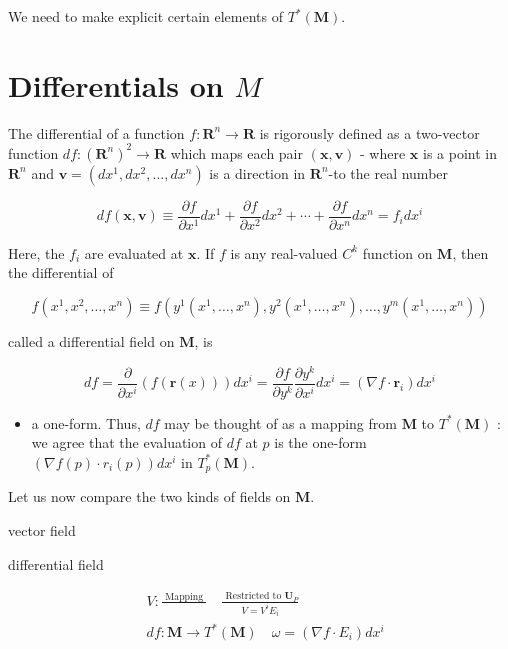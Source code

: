 \documentclass[10pt]{article}
\begin{document}
We need to make explicit certain elements of $T^{*}(\mathbf{M})$.

\section*{Differentials on $M$}
The differential of a function $f: \mathbf{R}^{n} \rightarrow \mathbf{R}$ is rigorously defined as a two-vector function $d f:\left(\mathbf{R}^{n}\right)^{2} \rightarrow \mathbf{R}$ which maps each pair $(\mathbf{x}, \mathbf{v})$ - where $\mathbf{x}$ is a point in $\mathbf{R}^{n}$ and $\mathbf{v}=\left(d x^{1}, d x^{2}, \ldots, d x^{n}\right)$ is a direction in $\mathbf{R}^{n}$-to the real number


\begin{equation*}
d f(\mathbf{x}, \mathbf{v}) \equiv \frac{\partial f}{\partial x^{1}} d x^{1}+\frac{\partial f}{\partial x^{2}} d x^{2}+\cdots+\frac{\partial f}{\partial x^{n}} d x^{n}=f_{i} d x^{i} \tag{13.8}
\end{equation*}


Here, the $f_{i}$ are evaluated at $\mathbf{x}$. If $f$ is any real-valued $C^{k}$ function on $\mathbf{M}$, then the differential of

$$
f\left(x^{1}, x^{2}, \ldots, x^{n}\right) \equiv f\left(y^{1}\left(x^{1}, \ldots, x^{n}\right), y^{2}\left(x^{1}, \ldots, x^{n}\right), \ldots, y^{m}\left(x^{1}, \ldots, x^{n}\right)\right)
$$

called a differential field on $\mathbf{M}$, is

$$
d f=\frac{\partial}{\partial x^{i}}(f(\mathbf{r}(x))) d x^{i}=\frac{\partial f}{\partial y^{k}} \frac{\partial y^{k}}{\partial x^{i}} d x^{i}=\left(\nabla f \cdot \mathbf{r}_{i}\right) d x^{i}
$$

\begin{itemize}
  \item a one-form. Thus, $d f$ may be thought of as a mapping from $\mathbf{M}$ to $T^{*}(\mathbf{M})$ : we agree that the evaluation of $d f$ at $p$ is the one-form $\left(\nabla f(p) \cdot r_{i}(p)\right) d x^{i}$ in $T_{p}^{*}(\mathbf{M})$.
\end{itemize}

Let us now compare the two kinds of fields on $\mathbf{M}$.

vector field

differential field

$$
\begin{aligned}
& V: \frac{\text { Mapping }}{} \quad \frac{\text { Restricted to } \mathbf{U}_{P}}{V=V^{i} E_{i}} \\
& d f: \mathbf{M} \rightarrow T^{*}(\mathbf{M}) \quad \omega=\left(\nabla f \cdot E_{i}\right) d x^{i}
\end{aligned}
$$
\end{document}
